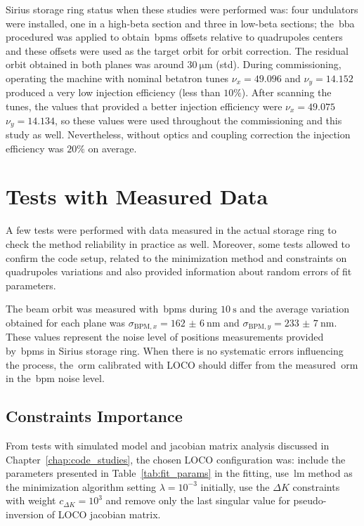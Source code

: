 Sirius storage ring status when these studies were performed was: four undulators were installed, one in a high-beta section and three in low-beta sections; the~\gls{bba} procedured was applied to obtain~\glspl{bpm} offsets relative to quadrupoles centers and these offsets were used as the target orbit for orbit correction. The residual orbit obtained in both planes was around $\SI{30}{\micro\meter}$ (\gls{std}). During commissioning, operating the machine with nominal betatron tunes $\nu_x = 49.096$ and $\nu_y = 14.152$ produced a very low injection efficiency (less than $10\%$). After scanning the tunes, the values that provided a better injection efficiency were $\nu_x = 49.075$ $\nu_y = 14.134$, so these values were used throughout the commissioning and this study as well. Nevertheless, without optics and coupling correction the injection efficiency was $20\%$ on average.
\section{Tests with Measured Data}\label{sec:tests_measured}
A few tests were performed with data measured in the actual storage ring to check the method reliability in practice as well. Moreover, some tests allowed to confirm the code setup, related to the minimization method and constraints on quadrupoles variations and also provided information about random errors of fit parameters.

The beam orbit was measured with~\glspl{bpm} during $\SI{10}{\second}$ and the average variation obtained for each plane was $\sigma_{\mathrm{BPM}, x} = \SI{162(6)}{\nano\meter}$ and $\sigma_{\mathrm{BPM}, y} = \SI{233(7)}{\nano\meter}$. These values represent the noise level of positions measurements provided by~\glspl{bpm} in Sirius storage ring. When there is no systematic errors influencing the process, the~\gls{orm} calibrated with LOCO should differ from the measured~\gls{orm} in the~\gls{bpm} noise level.

\subsection{Constraints Importance}\label{subsec:loco_config}
From tests with simulated model and jacobian matrix analysis discussed in Chapter~\ref{chap:code_studies}, the chosen LOCO configuration was: include the parameters presented in Table~\ref{tab:fit_params} in the fitting, use~\gls{lm} method as the minimization algorithm setting $\lambda = 10^{-3}$ initially, use the $\Delta K$ constraints with weight $c_{\Delta K} = 10^{3}$ and remove only the last singular value for pseudo-inversion of LOCO jacobian matrix. 

